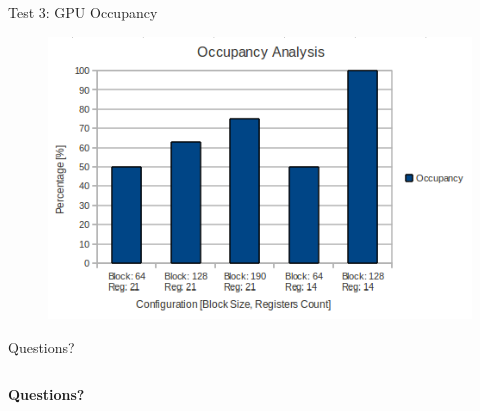 \documentclass[10pt, red]{beamer}
\begin{document}
	\begin{frame}{Test 3: GPU Occupancy}
	 	\begin{figure}
			\centering
			\includegraphics[width=\textwidth]{img/OccupancyAnalysis}
	 	\end{figure} 
	\end{frame}

	\begin{frame}{Questions?}
		\begin{columns}
			\textbf{Questions?}
		\end{columns}
	\end{frame}
\end{document}
